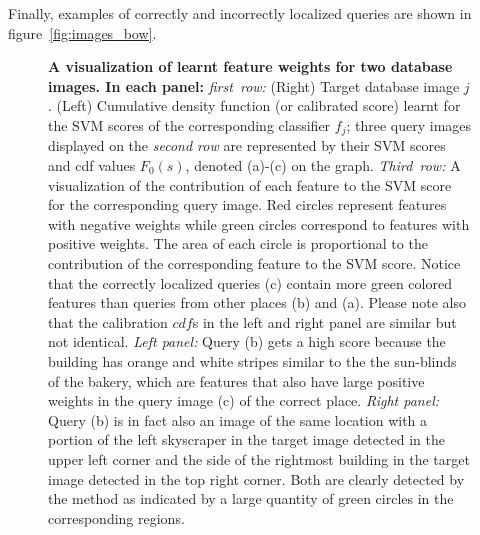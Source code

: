     Finally, examples of correctly and incorrectly localized queries are shown in figure~\ref{fig:images_bow}. 

  \begin{figure}[tbp]
    
    \vspace*{-2mm}
    \caption{
          {\bf  A visualization of learnt feature weights for two database images. In each panel:} 
         \emph{first~row:} (Right) Target database image $j$. (Left) Cumulative density function (or calibrated score) learnt for the SVM scores of the corresponding classifier $f_j$;  three query images displayed on the \emph{second row} are represented by their SVM scores and cdf values $F_0(s)$, denoted (a)-(c) on the graph. \emph{Third~row:} A visualization of the contribution of each feature to the SVM score for the corresponding query image. Red circles represent features with negative weights while green circles correspond to features with positive weights. The area of each circle is proportional to the contribution of the corresponding feature to the SVM score.
         Notice that the correctly localized queries (c) contain more green colored features than queries from other places (b) and (a).
        	 Please note also that the calibration $cdf$s in the left and right panel are similar but not identical. 
         {\it Left panel:} Query (b) gets a high score because the building has orange and white stripes similar to the the sun-blinds of the bakery, which are features that also have large positive weights in the query image (c) of the correct place.
         {\it Right panel:} Query (b) is in fact also an image of the same location with a portion of the left skyscraper in the target image detected in the upper left corner and the side of the rightmost building in the target image detected in the top right corner. Both are clearly detected by the method as indicated by a large quantity of green circles in the corresponding regions.
    }
    \label{fig:3qVSw}
    \vspace*{2mm}
  \end{figure}


